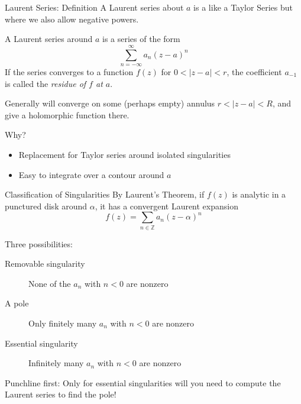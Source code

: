 \documentclass{beamer}
\newcommand{\Z}{\mathbb{Z}}
\begin{document}
\begin{frame}{Laurent Series: Definition}
  A Laurent series about $a$ is a like a Taylor Series but where we also allow negative powers.
  \begin{definition}

  A Laurent series around $a$ is a series of the form
  $$\sum_{n=-\infty}^\infty a_n(z-a)^n$$
If the series converges to a function $f(z)$ for $0<|z-a|<r$, the coefficient $a_{-1}$ is called the \emph{residue of $f$ at $a$}.
  \end{definition}
  
  Generally will converge on some (perhaps empty) annulus $r<|z-a|<R$, and give a holomorphic function there.
 
\begin{block}{Why?}  
  \begin{itemize}
  \item Replacement for Taylor series around isolated singularities
    \item Easy to integrate over a contour around $a$
\end{itemize}
 \end{block}
 \end{frame} 



\begin{frame}{Classification of Singularities}
By Laurent's Theorem, if $f(z)$ is analytic in a punctured disk around $\alpha$, it has a convergent Laurent expansion
$$f(z)=\sum_{n\in\Z} a_n (z-\alpha)^n$$
\begin{block}{Three possibilities:}
\begin{description}
   \item[Removable singularity] None of the $a_n$ with $n<0$ are nonzero
       \item[A pole] Only finitely many $a_n$ with $n<0$ are nonzero
    \item[Essential singularity] Infinitely many $a_n$ with $n<0$ are nonzero

\end{description}
\end{block}

\begin{block}{Punchline first:}
Only for essential singularities will you need to compute the Laurent series to find the pole!
\end{block}

\end{frame}
\end{document}
